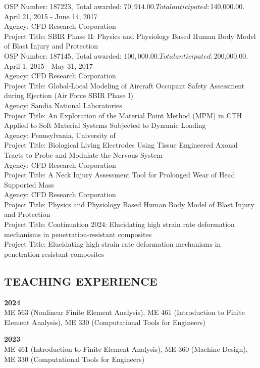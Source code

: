 \documentclass[a4paper,10pt]{article}
\begin{document}
OSP Number: 187223, Total awarded: $70,914.00. Total anticipated: $140,000.00. April 21, 2015 - June 14, 2017\\
Agency: CFD Research Corporation\\
Project Title: SBIR Phase II:    Physics and Physiology Based Human Body Model of Blast Injury and Protection\\
OSP Number: 187145, Total awarded: $100,000.00. Total anticipated: $200,000.00. April 1, 2015 - May 31, 2017\\
Agency: CFD Research Corporation\\
Project Title: Global-Local Modeling of Aircraft Occupant Safety Assessment during Ejection (Air Force SBIR Phase I)\\
Agency: Sandia National Laboratories\\
Project Title: An Exploration of the Material Point Method (MPM) in CTH Applied to Soft Material Systems Subjected to Dynamic Loading\\
Agency: Pennsylvania, University of\\
Project Title: Biological Living Electrodes Using Tissue Engineered Axonal Tracts to Probe and Modulate the Nervous System\\
Agency: CFD Research Corporation\\
Project Title: A Neck Injury Assessment Tool for Prolonged Wear of Head Supported Mass\\
Agency: CFD Research Corporation\\
Project Title: Physics and Physiology Based Human Body Model of Blast Injury and Protection\\
Project Title: Continuation 2024: Elucidating high strain rate deformation mechanisms in penetration-resistant composites\\
Project Title: Elucidating high strain rate deformation mechanisms in penetration-resistant composites\\

\subsection*{TEACHING EXPERIENCE}\label{teaching-experience}
\textbf{2024}\\
ME 563 (Nonlinear Finite Element Analysis), ME 461 (Introduction to Finite Element Analysis), ME 330 (Computational Tools for Engineers)

\textbf{2023}\\
ME 461 (Introduction to Finite Element Analysis), ME 360 (Machine Design), ME 330 (Computational Tools for Engineers)
\end{document}

